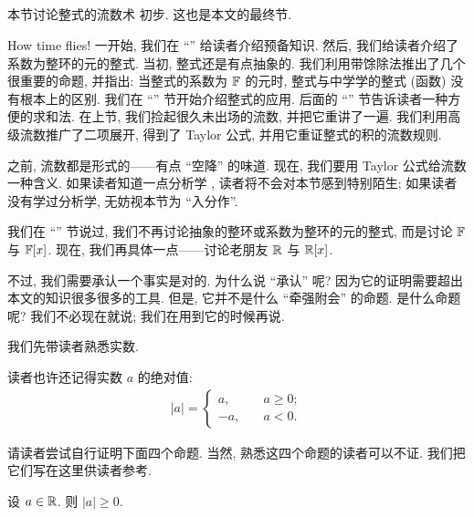\subsection*{\IntroductionToMethodOfFluxionsOnPolynomials}
\markright{\IntroductionToMethodOfFluxionsOnPolynomials}

本节讨论整式的流数术  初步. 这也是本文的最终节.

How time flies! 一开始, 我们在 ``\Prerequisites'' 给读者介绍预备知识. 然后, 我们给读者介绍了系数为整环的元的整式. 当初, 整式还是有点抽象的. 我们利用带馀除法推出了几个很重要的命题, 并指出: 当整式的系数为 $\mathbb{F}$ 的元时, 整式与中学学的整式 (函数) 没有根本上的区别. 我们在 ``\Interpolation'' 节开始介绍整式的应用. 后面的 ``\SummationFormulae'' 节告诉读者一种方便的求和法. 在上节, 我们捡起很久未出场的流数, 并把它重讲了一遍. 我们利用高级流数推广了二项展开, 得到了 Taylor 公式, 并用它重证整式的积的流数规则.

之前, 流数都是形式的——有点 ``空降'' 的味道. 现在, 我们要用 Taylor 公式给流数一种含义. 如果读者知道一点分析学 , 读者将不会对本节感到特别陌生; 如果读者没有学过分析学, 无妨视本节为 ``入分作''.

我们在 ``\PolynomialsOverF'' 节说过, 我们不再讨论抽象的整环或系数为整环的元的整式, 而是讨论 $\mathbb{F}$ 与 $\mathbb{F}[x]$. 现在, 我们再具体一点——讨论老朋友 $\mathbb{R}$ 与 $\mathbb{R}[x]$.

不过, 我们需要承认一个事实是对的. 为什么说 ``承认'' 呢? 因为它的证明需要超出本文的知识很多很多的工具. 但是, 它并不是什么 ``牵强附会'' 的命题. 是什么命题呢? 我们不必现在就说; 我们在用到它的时候再说.

我们先带读者熟悉实数.

读者也许还记得实数 $a$ 的绝对值:
\begin{align*}
    |a| = \begin{cases}
        a,  & \quad a \geq 0; \\
        -a, & \quad a < 0.
    \end{cases}
\end{align*}

请读者尝试自行证明下面四个命题. 当然, 熟悉这四个命题的读者可以不证. 我们把它们写在这里供读者参考.

\begin{proposition}
    设 $a \in \mathbb{R}$. 则 $|a| \geq 0$.
\end{proposition}

